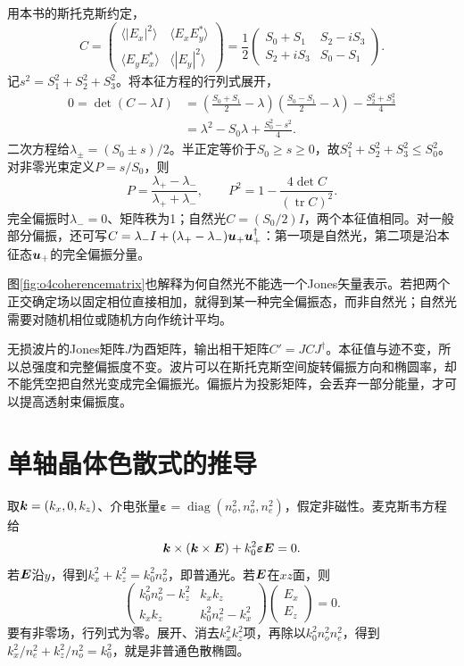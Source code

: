 用本书的斯托克斯约定，
\[
 C=\begin{pmatrix}\langle|E_x|^2\rangle&\langle E_xE_y^*\rangle\\
 \langle E_yE_x^*\rangle&\langle|E_y|^2\rangle\end{pmatrix}
 =\frac12\begin{pmatrix}
 S_0+S_1&S_2-iS_3\\S_2+iS_3&S_0-S_1
 \end{pmatrix}.
\]
记$s^2=S_1^2+S_2^2+S_3^2$。将本征方程的行列式展开，
\begin{align*}
 0=\det(C-\lambda I)
 &=\left(\frac{S_0+S_1}{2}-\lambda\right)
 \left(\frac{S_0-S_1}{2}-\lambda\right)-\frac{S_2^2+S_3^2}{4}\\
 &=\lambda^2-S_0\lambda+\frac{S_0^2-s^2}{4}.
\end{align*}
二次方程给$\lambda_\pm=(S_0\pm s)/2$。半正定等价于$S_0\geq s\geq0$，故$S_1^2+S_2^2+S_3^2\leq S_0^2$。对非零光束定义$P=s/S_0$，则
\[
 P=\frac{\lambda_+-\lambda_-}{\lambda_++\lambda_-},\qquad
 P^2=1-\frac{4\det C}{(\operatorname{tr}C)^2}.
\]
完全偏振时$\lambda_-=0$、矩阵秩为1；自然光$C=(S_0/2)I$，两个本征值相同。对一般部分偏振，还可写$C=\lambda_-I+(\lambda_+-\lambda_-)\bm{u}_+\bm{u}_+^\dagger$：第一项是自然光，第二项是沿本征态$\bm{u}_+$的完全偏振分量。

图\ref{fig:o4coherencematrix}也解释为何自然光不能选一个Jones矢量表示。若把两个正交确定场以固定相位直接相加，就得到某一种完全偏振态，而非自然光；自然光需要对随机相位或随机方向作统计平均。

无损波片的Jones矩阵$J$为酉矩阵，输出相干矩阵$C'=JCJ^\dagger$。本征值与迹不变，所以总强度和完整偏振度不变。波片可以在斯托克斯空间旋转偏振方向和椭圆率，却不能凭空把自然光变成完全偏振光。偏振片为投影矩阵，会丢弃一部分能量，才可以提高透射束偏振度。

\section{单轴晶体色散式的推导}
取$\bm{k}=(k_x,0,k_z)$、介电张量$\boldsymbol\varepsilon=\operatorname{diag}(n_o^2,n_o^2,n_e^2)$，假定非磁性。麦克斯韦方程给
\[
 \bm{k}\times(\bm{k}\times\bm{E})+k_0^2\boldsymbol\varepsilon\bm{E}=0.
\]
若$\bm{E}$沿$y$，得到$k_x^2+k_z^2=k_0^2n_o^2$，即普通光。若$\bm{E}$在$xz$面，则
\[
 \begin{pmatrix}k_0^2n_o^2-k_z^2&k_xk_z\\
 k_xk_z&k_0^2n_e^2-k_x^2\end{pmatrix}
 \begin{pmatrix}E_x\\E_z\end{pmatrix}=0.
\]
要有非零场，行列式为零。展开、消去$k_x^2k_z^2$项，再除以$k_0^2n_o^2n_e^2$，得到$k_x^2/n_e^2+k_z^2/n_o^2=k_0^2$，就是非普通色散椭圆。

